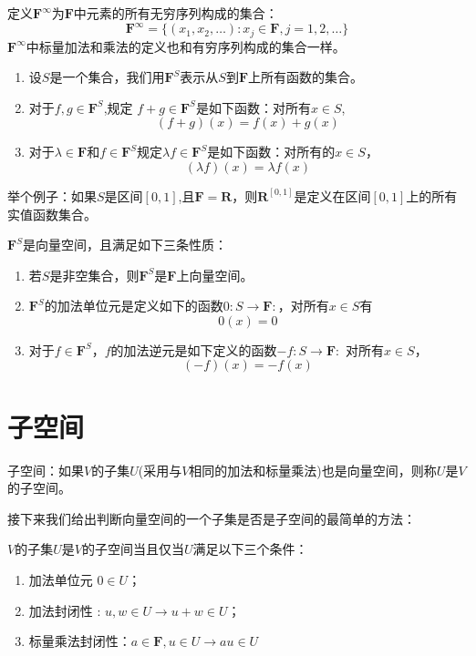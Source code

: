 \documentclass[10pt,a4paper,UTF8]{article}
\begin{document}
\begin{instance}
定义\(\mathbf{F}^{\infty}\)为\(\mathbf{F}\)中元素的所有无穷序列构成的集合：\[\mathbf{F}^{\infty} = \{(x_{1},x_{2},\ldots):x_{j}\in \mathbf{F},j=1,2,\ldots\}\]
\(\mathbf{F}^{\infty}\)中标量加法和乘法的定义也和有穷序列构成的集合一样。
\end{instance}

\begin{enumerate}
\item 设\(S\)是一个集合，我们用\(\mathbf{F}^{S}\)表示从\(S\)到\(\mathbf{F}\)上所有函数的集合。
\item 对于\(f,g\in \mathbf{F}^{S}\),规定 \(f+g\in\mathbf{F}^{S}\)是如下函数：对所有\(x\in S\), \[(f+g)(x)=f(x)+g(x)\]
\item 对于\(\lambda\in \mathbf{F}\)和\(f\in \mathbf{F}^{S}\)规定\(\lambda f\in \mathbf{F}^{S}\)是如下函数：对所有的\(x\in S\)，\[(\lambda f)(x)=\lambda f(x)\]
\end{enumerate}

举个例子：如果\(S\)是区间\([0,1]\),且\(\mathbf{F}=\mathbf{R}\)，则\(\mathbf{R}^{[0,1]}\)是定义在区间\([0,1]\)上的所有实值函数集合。


\(\mathbf{F}^{S}\)是向量空间，且满足如下三条性质：
\begin{enumerate}
\item 若\(S\)是非空集合，则\(\mathbf{F}^{S}\)是\(\mathbf{F}\)上向量空间。
\item \(\mathbf{F}^{S}\)的加法单位元是定义如下的函数\(0:S\rightarrow \mathbf{F}:\)，对所有\(x\in S\)有\[0(x) = 0\]
\item 对于\(f\in \mathbf{F}^{S}\)，\(f\)的加法逆元是如下定义的函数\(-f:S\rightarrow \mathbf{F}:\) 对所有\(x\in S\)，\[(-f)(x)=-f(x)\]
\end{enumerate}
\section{子空间}
\label{sec:orgheadline3}


\begin{definition}
子空间：如果\(V\)的子集\(U\)(采用与\(V\)相同的加法和标量乘法)也是向量空间，则称\(U\)是\(V\)的子空间。
\end{definition}
接下来我们给出判断向量空间的一个子集是否是子空间的最简单的方法：

\(V\)的子集\(U\)是\(V\)的子空间当且仅当\(U\)满足以下三个条件：

\begin{enumerate}
\item 加法单位元 \(0\in U\)；
\item 加法封闭性 : \(u,w\in U \rightarrow u+w\in U\)；
\item 标量乘法封闭性：\(a\in \mathbf{F}, u\in U \rightarrow au\in U\)
\end{enumerate}
\end{document}

